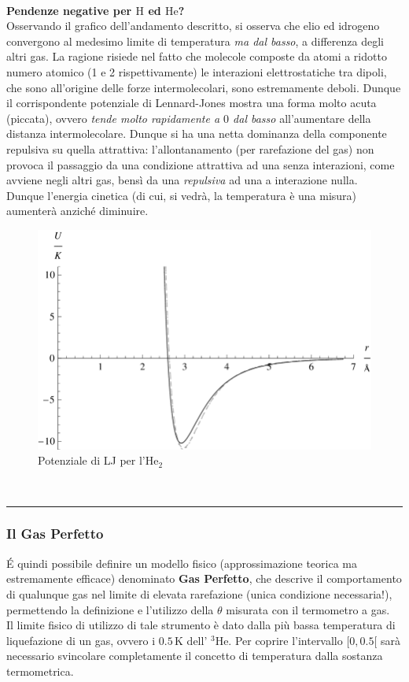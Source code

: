 \documentclass[10pt, oneside]{book}
\newcommand{\infobox}[2]{\vspace{0.5cm}~\\ \textbf{#1} \hrulefill \vspace{0.2cm}\\#2 {}\,\\\hrule \vspace{0.5cm}}
\begin{document}
\infobox{Pendenze negative per $\mathrm{H}$ ed $\mathrm{He}$?}{
Osservando il grafico dell'andamento descritto, si osserva che elio ed idrogeno convergono al medesimo limite di temperatura \textit{ma dal basso}, a differenza degli altri gas. La ragione risiede nel fatto che molecole composte da atomi a ridotto numero atomico (1 e 2 rispettivamente) le interazioni elettrostatiche tra dipoli, che sono all'origine delle forze intermolecolari, sono estremamente deboli. Dunque il corrispondente potenziale di Lennard-Jones mostra una forma molto acuta (piccata), ovvero \textit{tende molto rapidamente a $0$ dal basso} all'aumentare della distanza intermolecolare. Dunque si ha una netta dominanza della componente repulsiva su quella attrattiva: l'allontanamento (per rarefazione del gas) non provoca il passaggio da una condizione attrattiva ad una senza interazioni, come avviene negli altri gas, bensì da una \textit{repulsiva} ad una a interazione nulla.\\Dunque l'energia cinetica (di cui, si vedrà, la temperatura è una misura) aumenterà anziché diminuire.
\begin{figure}[h!]
\centering
\includegraphics[scale=0.25]{lennardjj.png}
\caption{Potenziale di LJ per l'$\mathrm{He}_2$}
\end{figure}
}

\subsubsection*{Il Gas Perfetto}
\'E quindi possibile definire un modello fisico (approssimazione teorica ma estremamente efficace) denominato \textbf{Gas Perfetto}, che descrive il comportamento di qualunque gas nel limite di elevata rarefazione (unica condizione necessaria!), permettendo la definizione e l'utilizzo della $\theta$ misurata con il termometro a gas. 
\\Il limite fisico di utilizzo di tale strumento è dato dalla più bassa temperatura di liquefazione di un gas, ovvero i $0.5 \, \mathrm{K}$ dell' $\mathrm{{}^3He}$. Per coprire l'intervallo $[0, 0.5[$ sarà necessario svincolare completamente il concetto di temperatura dalla sostanza termometrica.
\end{document}

